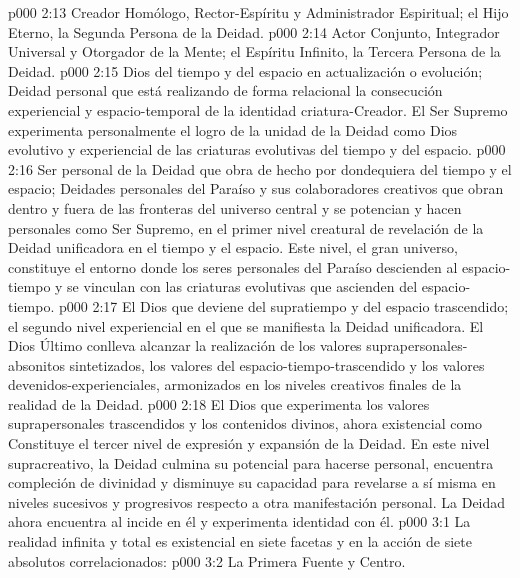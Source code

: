 \vs p000 2:13  Creador Homólogo, Rector\hyp{}Espíritu y Administrador Espiritual; el Hijo Eterno, la Segunda Persona de la Deidad.
\vs p000 2:14  Actor Conjunto, Integrador Universal y Otorgador de la Mente; el Espíritu Infinito, la Tercera Persona de la Deidad.
\vs p000 2:15  Dios del tiempo y del espacio en actualización o evolución; Deidad personal que está realizando de forma relacional la consecución experiencial y espacio\hyp{}temporal de la identidad criatura\hyp{}Creador. El Ser Supremo experimenta personalmente el logro de la unidad de la Deidad como Dios evolutivo y experiencial de las criaturas evolutivas del tiempo y del espacio.
\vs p000 2:16  Ser personal de la Deidad que obra de hecho por dondequiera del tiempo y el espacio; Deidades personales del Paraíso y sus colaboradores creativos que obran dentro y fuera de las fronteras del universo central y se potencian y hacen personales como Ser Supremo, en el primer nivel creatural de revelación de la Deidad unificadora en el tiempo y el espacio. Este nivel, el gran universo, constituye el entorno donde los seres personales del Paraíso descienden al espacio\hyp{}tiempo y se vinculan con las criaturas evolutivas que ascienden del espacio\hyp{}tiempo.
\vs p000 2:17  El Dios que deviene del supratiempo y del espacio trascendido; el segundo nivel experiencial en el que se manifiesta la Deidad unificadora. El Dios Último conlleva alcanzar la realización de los valores suprapersonales\hyp{}absonitos sintetizados, los valores del espacio\hyp{}tiempo\hyp{}trascendido y los valores devenidos\hyp{}experienciales, armonizados en los niveles creativos finales de la realidad de la Deidad.
\vs p000 2:18  El Dios que experimenta los valores suprapersonales trascendidos y los contenidos divinos, ahora existencial como  Constituye el tercer nivel de expresión y expansión de la Deidad. En este nivel supracreativo, la Deidad culmina su potencial para hacerse personal, encuentra compleción de divinidad y disminuye su capacidad para revelarse a sí misma en niveles sucesivos y progresivos respecto a otra manifestación personal. La Deidad ahora encuentra al  incide en él y experimenta identidad con él.
\vs p000 3:1 La realidad infinita y total es existencial en siete facetas y en la acción de siete absolutos correlacionados:
\vs p000 3:2 La Primera Fuente y Centro.
